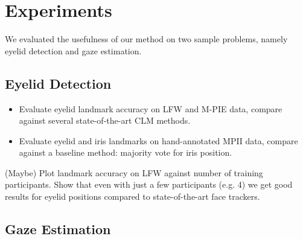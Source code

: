 
\section{Experiments}

We evaluated the usefulness of our method on two sample problems, namely eyelid detection and gaze estimation.

\subsection{Eyelid Detection}


\begin{itemize}
    \item Evaluate eyelid landmark accuracy on LFW and M-PIE data, compare against several state-of-the-art CLM methods.
    \item Evaluate eyelid and iris landmarks on hand-annotated MPII data, compare against a baseline method: majority vote for iris position.
\end{itemize}

(Maybe) Plot landmark accuracy on LFW against number of training participants. Show that even with just a few participants (e.g. 4) we get good results for eyelid positions compared to state-of-the-art face trackers.


\subsection{Gaze Estimation}



